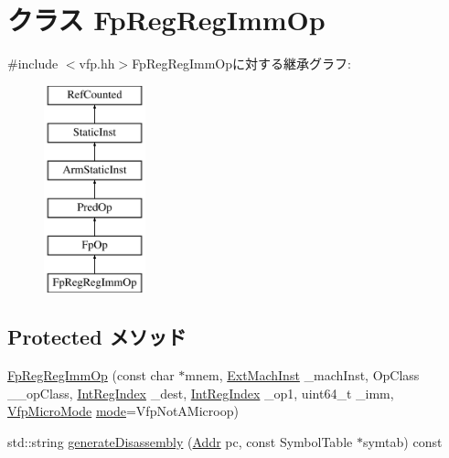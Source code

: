 \hypertarget{classArmISA_1_1FpRegRegImmOp}{
\section{クラス FpRegRegImmOp}
\label{classArmISA_1_1FpRegRegImmOp}
}


{\ttfamily \#include $<$vfp.hh$>$}FpRegRegImmOpに対する継承グラフ:\begin{figure}[H]
\begin{center}
\leavevmode
\includegraphics[height=6cm]{classArmISA_1_1FpRegRegImmOp}
\end{center}
\end{figure}
\subsection*{Protected メソッド}
\begin{DoxyCompactItemize}
\item 
\hyperlink{classArmISA_1_1FpRegRegImmOp_aa89d1706daafa0e03a6b9d846a631f61}{FpRegRegImmOp} (const char $\ast$mnem, \hyperlink{classStaticInst_a5605d4fc727eae9e595325c90c0ec108}{ExtMachInst} \_\-machInst, OpClass \_\-\_\-opClass, \hyperlink{namespaceArmISA_ae64680ba9fb526106829d6bf92fc791b}{IntRegIndex} \_\-dest, \hyperlink{namespaceArmISA_ae64680ba9fb526106829d6bf92fc791b}{IntRegIndex} \_\-op1, uint64\_\-t \_\-imm, \hyperlink{namespaceArmISA_ad386ea556acd7cd538c64e2d73933714}{VfpMicroMode} \hyperlink{namespaceArmISA_a5f3b9b97eb2dfa29d33e74878455f90d}{mode}=VfpNotAMicroop)
\item 
std::string \hyperlink{classArmISA_1_1FpRegRegImmOp_a95d323a22a5f07e14d6b4c9385a91896}{generateDisassembly} (\hyperlink{classm5_1_1params_1_1Addr}{Addr} pc, const SymbolTable $\ast$symtab) const 
\end{DoxyCompactItemize}

